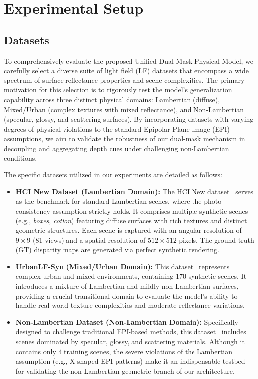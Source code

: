 \section{Experimental Setup}

\subsection{Datasets}
To comprehensively evaluate the proposed Unified Dual-Mask Physical Model, we carefully select a diverse suite of light field (LF) datasets that encompass a wide spectrum of surface reflectance properties and scene complexities. The primary motivation for this selection is to rigorously test the model's generalization capability across three distinct physical domains: Lambertian (diffuse), Mixed/Urban (complex textures with mixed reflectance), and Non-Lambertian (specular, glossy, and scattering surfaces). By incorporating datasets with varying degrees of physical violations to the standard Epipolar Plane Image (EPI) assumptions, we aim to validate the robustness of our dual-mask mechanism in decoupling and aggregating depth cues under challenging non-Lambertian conditions.

The specific datasets utilized in our experiments are detailed as follows:

\begin{itemize}
    \item \textbf{HCI New Dataset (Lambertian Domain):} The HCI New dataset~\cite{honauer2016hci} serves as the benchmark for standard Lambertian scenes, where the photo-consistency assumption strictly holds. It comprises multiple synthetic scenes (e.g., \textit{boxes}, \textit{cotton}) featuring diffuse surfaces with rich textures and distinct geometric structures. Each scene is captured with an angular resolution of $9 \times 9$ (81 views) and a spatial resolution of $512 \times 512$ pixels. The ground truth (GT) disparity maps are generated via perfect synthetic rendering.
    
    \item \textbf{UrbanLF-Syn (Mixed/Urban Domain):} This dataset~\cite{urbanlf2020} represents complex urban and mixed environments, containing 170 synthetic scenes. It introduces a mixture of Lambertian and mildly non-Lambertian surfaces, providing a crucial transitional domain to evaluate the model's ability to handle real-world texture complexities and moderate reflectance variations.
    
    \item \textbf{Non-Lambertian Dataset (Non-Lambertian Domain):} Specifically designed to challenge traditional EPI-based methods, this dataset~\cite{nllf2021} includes scenes dominated by specular, glossy, and scattering materials. Although it contains only 4 training scenes, the severe violations of the Lambertian assumption (e.g., X-shaped EPI patterns) make it an indispensable testbed for validating the non-Lambertian geometric branch of our architecture.
\end{itemize}

